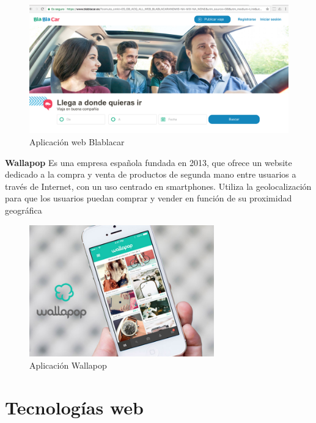 \begin{figure}[!h]
    \centering
    \includegraphics[width=140mm]{img/introduccion/blablacar.png}
    \caption{Aplicación web Blablacar}
\end{figure}

\textbf {Wallapop} Es una empresa española fundada en 2013, que ofrece un website dedicado a la compra y venta de productos de segunda mano entre usuarios a través de Internet, con un uso centrado en smartphones. Utiliza la geolocalización para que los usuarios puedan comprar y vender en función de su proximidad geográfica

\begin{figure}[!h]
    \centering
    \includegraphics[width=80mm]{img/introduccion/Wallapop-iPhone.jpg}
    \caption{Aplicación Wallapop}
\end{figure}


\section{Tecnologías web}

